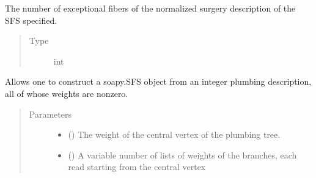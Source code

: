 \documentclass[letterpaper,10pt,english]{sphinxmanual}
\begin{document}
\begin{fulllineitems}
\begin{fulllineitems}
\begin{quote}
\begin{description}
\end{description}\end{quote}

\end{fulllineitems}


\begin{fulllineitems}
\label{\detokenize{soapy:soapy.SFS.exceptional_fibers}}
\sphinxAtStartPar
The number of exceptional fibers of the normalized surgery description of the SFS specified.
\begin{quote}\begin{description}
\item[{Type}] \leavevmode
\sphinxAtStartPar
int

\end{description}\end{quote}

\end{fulllineitems}


\begin{fulllineitems}
\label{\detokenize{soapy:soapy.SFS.from_plumbing}}
\sphinxAtStartPar
Allows one to construct a soapy.SFS object from an integer plumbing description, all of whose weights are non\sphinxhyphen{}zero.
\begin{quote}\begin{description}
\item[{Parameters}] \leavevmode\begin{itemize}
\item {} 
\sphinxAtStartPar
{} () \textendash{} The weight of the central vertex of the plumbing tree.

\item {} 
\sphinxAtStartPar
{} (\sphinxstyleliteralemphasis{\sphinxupquote{{[}}}\sphinxstyleliteralemphasis{\sphinxupquote{{]}}}) \textendash{} A variable number of lists of weights of the branches, each read starting from the central vertex


\end{itemize}
\end{description}
\end{quote}
\end{fulllineitems}
\end{fulllineitems}
\end{document}
